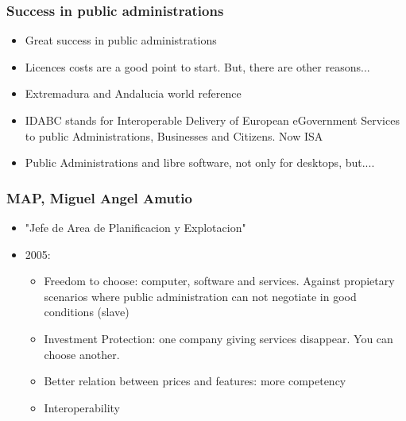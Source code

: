 \documentclass{beamer}
\begin{document}
\begin{frame}
\frametitle{ Success in public administrations}

\begin{itemize}

\item Great success in public administrations
\item Licences costs are a good point to start. But, there are other reasons...
\item Extremadura and Andalucia world reference
\item IDABC stands for Interoperable Delivery of European eGovernment Services to public Administrations, Businesses and Citizens. Now ISA
\item Public Administrations and libre software, not only for desktops, but....

\end{itemize}

\end{frame}



\begin{frame}
\frametitle{ MAP, Miguel Angel Amutio}

\begin{itemize}
\item "Jefe de Area de Planificacion y Explotacion"
\item 2005:
\begin {itemize}
	\item Freedom to choose: computer, software and services. Against propietary scenarios where public administration can not negotiate in good conditions (slave)
	\item Investment Protection: one company giving services disappear. You can choose another. 
	\item Better relation between prices and features: more competency
	\item Interoperability
\end {itemize}
\end{itemize}

\end{frame}
\end{document}
